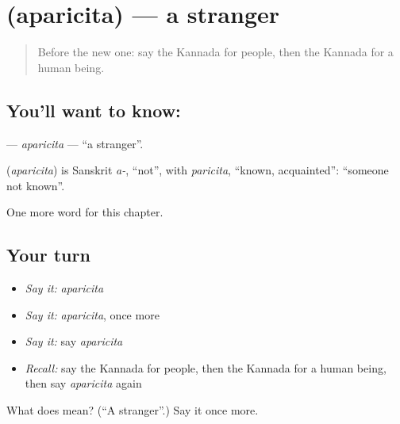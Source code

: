 \section[\texorpdfstring{\kn{ಅಪರಿಚಿತ} (aparicita)}{ಅಪರಿಚಿತ (aparicita)}]{ (aparicita) — a stranger}

\label{lesson:KA-C299-aparicita}



\begin{quote}
Before the new one: say the Kannada for people, then the Kannada for a human being.
\end{quote}

\subsection*{You'll want to know: }
\textbf{} — \emph{aparicita} — \textquotedblleft{}a stranger\textquotedblright{}.

\begin{cousinweb}
\textbf{} (\emph{aparicita}) is Sanskrit \emph{a-}, \textquotedblleft{}not\textquotedblright{}, with \emph{paricita}, \textquotedblleft{}known, acquainted\textquotedblright{}: \textquotedblleft{}someone not known\textquotedblright{}.
\end{cousinweb}

\begin{grammarlens}[title={What you've built}]
One more word for this chapter.
\end{grammarlens}

\subsection*{Your turn}
\begin{itemize}
\raggedright
  \item \emph{Say it:} \emph{aparicita}
  \item \emph{Say it:} \emph{aparicita}, once more
  \item \emph{Say it:} say \emph{aparicita}
  \item \emph{Recall:} say the Kannada for people, then the Kannada for a human being, then say \emph{aparicita} again
\end{itemize}

\begin{tcolorbox}[breakable,colback=teal!4,colframe=teal!35!black,title={Before you move on}]
What does  mean? (\textquotedblleft{}A stranger\textquotedblright{}.) Say it once more.
\end{tcolorbox}
